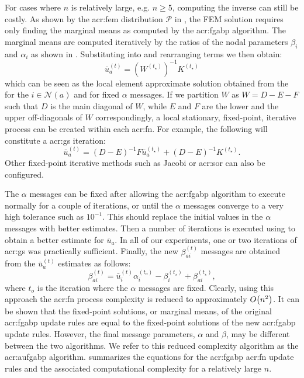 For cases where $n$ is relatively large, e.g. $n\geq5$, computing the inverse can still be costly.
As shown by the \gls{acr:fem} distribution $\mathcal{P}$ in , the FEM solution requires only finding the marginal means as computed by the \gls{acr:fgabp} algorithm.
The marginal means are computed iteratively by the ratios of the nodal parameters $\beta_i$ and $\alpha_i$ as shown in .
Substituting  into  and rearranging terms we then obtain:
\begin{equation}
	\bar{u}_a^{(t)} = (W^{(t_\star)})^{-1} K^{(t_\star)} \label{eqn:locSol}
\end{equation}
which can be seen as the local element approximate solution obtained from the  for the  $i\in\mathcal{N}(a)$ and for fixed $\alpha$ messages.
If we partition $W$ as $W = D-E-F$ such that $D$ is the main diagonal of $W$, while $E$ and $F$ are the lower and the upper off-diagonals of $W$ correspondingly, a local stationary, fixed-point, iterative process can be created within each \gls{acr:fn}.
For example, the following will constitute a \gls{acr:gs} iteration:
\begin{equation}
	\bar{u}_a^{(t)} = (D-E)^{-1} F \bar{u}_a^{(t_\star)} + (D-E)^{-1} K^{(t_\star)}. \label{eqn:gsUpdate}
\end{equation}
Other fixed-point iterative methods such as Jacobi or \gls{acr:sor} can also be configured.


The $\alpha$ messages can be fixed after allowing the \gls{acr:fgabp} algorithm to execute normally for a couple of iterations, or until the $\alpha$ messages converge to a very high tolerance such as $10^{-1}$.
This should replace the initial values in the $\alpha$ messages with better estimates.
Then a number of iterations is executed using  to obtain a better estimate for $\bar{u}_a$.
In all of our experiments, one or two iterations of \gls{acr:gs} was practically sufficient.
Finally, the new $\beta_{ai}^{(t)}$ messages are obtained from the $\bar{u}_a^{(t)}$ estimates as follows:
\begin{equation}
	\beta_{ai}^{(t)} = \bar{u}_i^{(t)} \alpha_i^{(t_o)} - \beta_i^{(t_\star)} + \beta_{ai}^{(t_\star)}, \label{eqn:gsBetaUpdate}
\end{equation}
where $t_o$ is the iteration where the $\alpha$ messages are fixed.
Clearly, using this approach the \gls{acr:fn} process complexity is reduced to approximately $ O\bigl(n^2\bigr)$.
It can be shown that the fixed-point solutions, or marginal means, of the original \gls{acr:fgabp} update rules are equal to the fixed-point solutions of the new \gls{acr:fgabp} update rules.
However, the final message parameters, $\alpha$ and $\beta$, may be different between the two algorithms.
We refer to this reduced complexity algorithm as the \gls{acr:aufgabp} algorithm.
 summarizes the equations for the \gls{acr:fgabp} \gls{acr:fn} update rules and the associated computational complexity for a relatively large $n$.

